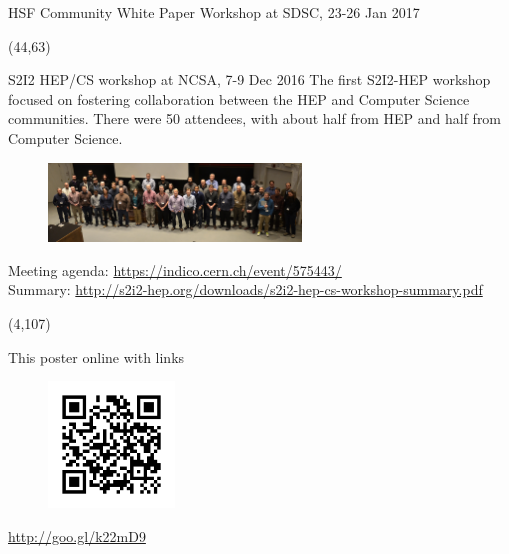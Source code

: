 \documentclass[final]{beamer}
\begin{document}
\begin{frame}{}
\begin{textblock}{38.0}
\begin{block}{HSF Community White Paper Workshop at SDSC, 23-26 Jan 2017}
\begin{textblock}{38.0}(44,63)
\begin{block}{S2I2 HEP/CS workshop at NCSA, 7-9 Dec 2016}
The first S2I2-HEP workshop focused on fostering collaboration between the HEP and Computer Science communities. There were 50 attendees, with about half from HEP and half from Computer Science.
\begin{figure}[tbph]
\centering
\includegraphics[width=0.60\textwidth]{images/20161208-s2i2-hep-cs-group-photo.jpg}
\end{figure}
{\small Meeting agenda: \url{https://indico.cern.ch/event/575443/}} \\
{\small Summary: \url{http://s2i2-hep.org/downloads/s2i2-hep-cs-workshop-summary.pdf}}
\end{block}
\end{textblock}

\end{block}
\end{textblock}




\begin{textblock}{14.0}(4,107)
\begin{block}{This poster online with links}
\begin{figure}[tbph]
\centering
\includegraphics[width=0.30\textwidth]{images/qr-s2i2-hep-si2-pi-workshop-2017.png}
\end{figure}
\begin{center}
\url{http://goo.gl/k22mD9}
\end{center}
\end{block}
\end{textblock}



\end{frame}
\end{document}
